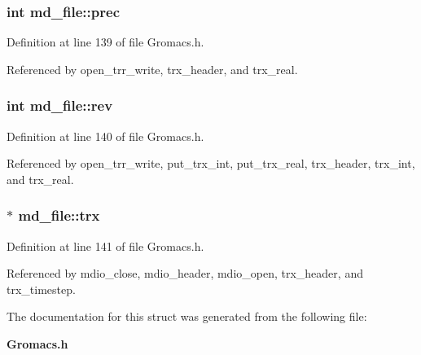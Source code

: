 \subsubsection{\setlength{\rightskip}{0pt plus 5cm}int md\_\-file::prec}\label{structmd__file_m2}




Definition at line 139 of file Gromacs.h.

Referenced by open\_\-trr\_\-write, trx\_\-header, and trx\_\-real.
\subsubsection{\setlength{\rightskip}{0pt plus 5cm}int md\_\-file::rev}\label{structmd__file_m3}




Definition at line 140 of file Gromacs.h.

Referenced by open\_\-trr\_\-write, put\_\-trx\_\-int, put\_\-trx\_\-real, trx\_\-header, trx\_\-int, and trx\_\-real.
\subsubsection{$\ast$ md\_\-file::trx}\label{structmd__file_m4}




Definition at line 141 of file Gromacs.h.

Referenced by mdio\_\-close, mdio\_\-header, mdio\_\-open, trx\_\-header, and trx\_\-timestep.

The documentation for this struct was generated from the following file:\begin{CompactItemize}
\item 
{\bf Gromacs.h}\end{CompactItemize}

